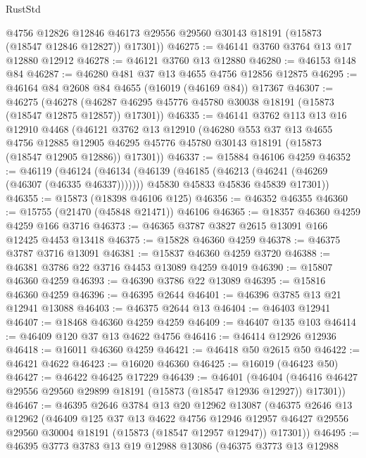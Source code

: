 \begin{lexlean}{RustStd}
\begin{coremodule}
        @4756
        @12826
        @12846
        @46173
        @29556
        @29560
        @30143
        @18191
        (@15873 (@18547 @12846 @12827))
        @17301))
@46275 := @46141 @3760 @3764 @13 @17 @12880 @12912
@46278 := @46121 @3760 @13 @12880
@46280 := @46153 @148 @84
@46287 := @46280 @481 @37 @13 @4655 @4756 @12856 @12875
@46295 := @46164 @84 @2608 @84 @4655 (@16019 (@46169 @84)) @17367
@46307 := @46275
    (@46278 (@46287 @46295 @45776 @45780 @30038 @18191 (@15873 (@18547 @12875 @12857)) @17301))
@46335 := @46141
    @3762
    @113
    @13
    @16
    @12910
    @4468
    (@46121
      @3762
      @13
      @12910
      (@46280
        @553
        @37
        @13
        @4655
        @4756
        @12885
        @12905
        @46295
        @45776
        @45780
        @30143
        @18191
        (@15873 (@18547 @12905 @12886))
        @17301))
@46337 := @15884 @46106 @4259
@46352 := @46119
    (@46124
      (@46134
        (@46139 (@46185 (@46213 (@46241 (@46269 (@46307 (@46335 @46337)))))))
        @45830
        @45833
        @45836
        @45839
        @17301))
@46355 := @15873 (@18398 @46106 @125)
@46356 := @46352 @46355
@46360 := @15755 (@21470 (@45848 @21471)) @46106
@46365 := @18357 @46360 @4259 @4259 @166 @3716
@46373 := @46365 @3787 @3827 @2615 @13091 @166 @12425 @4453 @13418
@46375 := @15828 @46360 @4259
@46378 := @46375 @3787 @3716 @13091
@46381 := @15837 @46360 @4259 @3720
@46388 := @46381 @3786 @22 @3716 @4453 @13089 @4259 @4019
@46390 := @15807 @46360 @4259
@46393 := @46390 @3786 @22 @13089
@46395 := @15816 @46360 @4259
@46396 := @46395 @2644
@46401 := @46396 @3785 @13 @21 @12941 @13088
@46403 := @46375 @2644 @13
@46404 := @46403 @12941
@46407 := @18468 @46360 @4259 @4259
@46409 := @46407 @135 @103
@46414 := @46409 @120 @37 @13 @4622 @4756
@46416 := @46414 @12926 @12936
@46418 := @16011 @46360 @4259
@46421 := @46418 @50 @2615 @50
@46422 := @46421 @4622
@46423 := @16020 @46360
@46425 := @16019 (@46423 @50)
@46427 := @46422 @46425 @17229
@46439 := @46401
    (@46404 (@46416 @46427 @29556 @29560 @29899 @18191 (@15873 (@18547 @12936 @12927)) @17301))
@46467 := @46395
    @2646
    @3784
    @13
    @20
    @12962
    @13087
    (@46375
      @2646
      @13
      @12962
      (@46409
        @125
        @37
        @13
        @4622
        @4756
        @12946
        @12957
        @46427
        @29556
        @29560
        @30004
        @18191
        (@15873 (@18547 @12957 @12947))
        @17301))
@46495 := @46395
    @3773
    @3783
    @13
    @19
    @12988
    @13086
    (@46375
      @3773
      @13
      @12988

\end{coremodule}
\end{lexlean}
